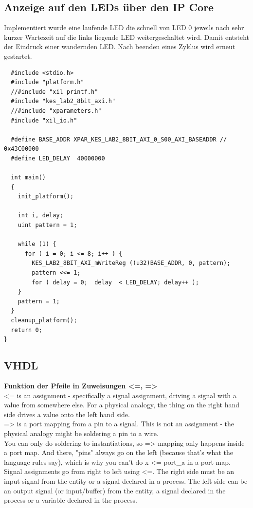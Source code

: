 \subsection{Anzeige auf den LEDs über den IP Core}
Implementiert wurde eine laufende LED die schnell von LED 0 jeweils nach sehr kurzer Wartezeit auf die links 
liegende LED weitergeschaltet wird. Damit entsteht der Eindruck einer wandernden LED. Nach beenden eines 
Zyklus wird erneut gestartet.

\begin{verbatim}
  #include <stdio.h>
  #include "platform.h"
  //#include "xil_printf.h" 
  #include "kes_lab2_8bit_axi.h"
  //#include "xparameters.h"
  #include "xil_io.h"

  #define BASE_ADDR XPAR_KES_LAB2_8BIT_AXI_0_S00_AXI_BASEADDR // 0x43C00000
  #define LED_DELAY  40000000

  int main()
  {
    init_platform();

    int i, delay;
    uint pattern = 1;

    while (1) {
      for ( i = 0; i <= 8; i++ ) {
        KES_LAB2_8BIT_AXI_mWriteReg ((u32)BASE_ADDR, 0, pattern);
        pattern <<= 1;
        for ( delay = 0;  delay  < LED_DELAY; delay++ );
    }
    pattern = 1;
  }
  cleanup_platform();
  return 0;
}
\end{verbatim}



\subsection{VHDL}

\textbf{Funktion der Pfeile in Zuweisungen  <=, =>}\\
<= is an assignment - specifically a signal assignment, driving a signal with a value from somewhere else. For a physical analogy, the thing on the right hand side drives a value onto the left hand side.\\

=> is a port mapping from a pin to a signal. This is not an assignment - the physical analogy might be soldering a pin to a wire.\\

You can only do soldering to instantiations, so => mapping only happens inside a port map. And there, "pins" always go on the left (because that's what the language rules say), which is why you can't do x <= port\_a in a port map.\\

Signal assignments go from right to left using <=. The right side must be an input signal from the entity or a signal declared in a process. The left side can be an output signal (or input/buffer) from the entity, a signal declared in the process or a variable declared in the process.\\


